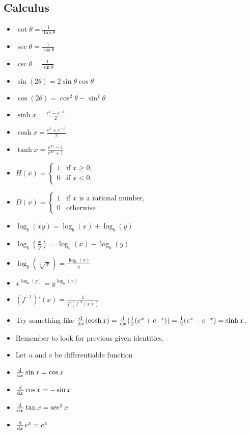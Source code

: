 \documentclass{article}
\begin{document}
\begin{multicols}{2}
\section{Calculus}
\begin{itemize}[leftmargin=0.5cm]
    \item $\cot\theta=\frac{1}{\tan\theta}$
    \item $\sec\theta=\frac{1}{\cos\theta}$
    \item $\csc\theta=\frac{1}{\sin\theta}$
    \item $\sin(2\theta)=2\sin\theta\cos\theta$
    \item $\cos(2\theta)=\cos^2\theta-\sin^2\theta$
    \item $\sinh x=\frac{e^x-e^{-x}}{2}$
    \item $\cosh x=\frac{e^x+e^{-x}}{2}$
    \item $\tanh x=\frac{e^{2x}-1}{e^{2x}+1}$
    \item $H(x)=\begin{cases}1&\text{if }x\geq0,\\0&\text{if }x<0,\end{cases}$
    \item $D(x)=\begin{cases}1&\text{if }x\text{ is a rational number,}\\0&\text{otherwise}\end{cases}$
    \item $\log_b(xy)=\log_b(x)+\log_b(y)$
    \item $\log_b\left(\frac{x}{y}\right)=\log_b(x)-\log_b(y)$
    \item $\log_b(\sqrt[y]{x})=\frac{\log_b(x)}{y}$
    \item $x^{\log_b(y)}=y^{\log_b(x)}$
    \item $(f^{-1})'(x)=\frac{1}{f'(f^{-1}(x))}$
    \item Try something like $\od{}{x}(\cosh x)=\od{}{x}(\frac{1}{2}(e^x+e^{-x}))\\=\frac{1}{2}(e^x-e^{-x})=\sinh x$. 
    \item Remember to look for previous given identities.
    \item Let $u$ and $v$ be differentiable function
    \item $\od{}{x}\sin x=\cos x$
    \item $\od{}{x}\cos x=-\sin x$
    \item $\od{}{x}\tan x=\sec^2x$
    \item $\od{}{x}e^x=e^x$

\end{itemize}
\end{multicols}
\end{document}
